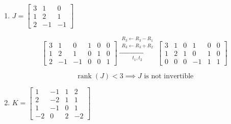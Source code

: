 \begin{enumerate}[label=\alph*)]
\begin{answer}
    $$
    \xrightarrow[t_5,t_6,t_7]{
        \substack{
            R_3\leftarrow-R_3\\
            R_1\leftarrow R_1-2R_3\\
            R_1\leftarrow R_1+R_2
        }
    }
    \left[
    \begin{array}{ccc|ccc}
        1 & 0 & 0 & 3 & -3 & 2\\
        0 & 1 & 0 & 1 & -2 & 0\\
        0 & 0 & 1 & -1 & 1 & -1
    \end{array}
    \right]
    \implies
    $$

    $$
    \implies
    \boxed{
    I^{-1}=
    \begin{bmatrix}
        3 & -3 & 2\\
        1 & -2 & 0\\
        -1 & 1 & -1
    \end{bmatrix}
    }
    $$
\end{answer}

\item
$J=
\begin{bmatrix}
    3 & 1 & 0\\
    1 & 2 & 1\\
    2 & -1 & -1
\end{bmatrix}
$

\begin{answer}
    $$
    \left[
    \begin{array}{ccc|ccc}
        3 & 1 & 0 & 1 & 0 & 0\\
        1 & 2 & 1 & 0 & 1 & 0\\
        2 & -1 & -1 & 0 & 0 & 1
    \end{array}
    \right]
    \xrightarrow[t_1,t_2]{
        \substack{
            R_3\leftarrow R_3-R_1\\
            R_3\leftarrow R_3+R_2
        }
    }
    \left[
    \begin{array}{ccc|ccc}
        3 & 1 & 0 & 1 & 0 & 0\\
        1 & 2 & 1 & 0 & 1 & 0\\
        0 & 0 & 0 & -1 & 1 & 1
    \end{array}
    \right]
    $$

    $$
    \operatorname{rank}(J)<3
    \implies
    \boxed{J\text{ is not invertible}}
    $$
\end{answer}

\item
$K=
\begin{bmatrix}
    1 & -1 & 1 & 2\\
    2 & -2 & 1 & 1\\
    1 & -1 & 0 & 1\\
    -2 & 0 & 2 & -2
\end{bmatrix}
$


\end{enumerate}
